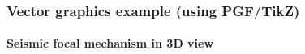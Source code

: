 \begin{frame}
    \frametitle{Vector graphics example (using PGF/TikZ)}
    \framesubtitle{Seismic focal mechanism in 3D view}
    \vspace*{-6mm}









\end{frame}
